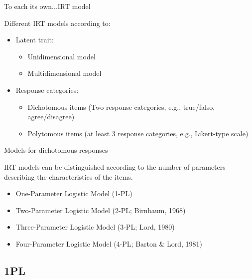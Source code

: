 \documentclass[aspectratio=149, compress]{beamer}
\begin{document}
\begin{frame}{To each its own...IRT model}

Different IRT models according to:
	
\begin{itemize}
	\item Latent trait:
	\begin{itemize}
		\item \textcolor<2>{unipd}{Unidimensional model}
		\item  Multidimensional model	
	\end{itemize}
	
	\item Response categories: 
	
	\begin{itemize}
		\item  \textcolor<2>{unipd}{Dichotomous items} (Two response categories, e.g., true/falso, agree/disagree)
		\item Polytomous items (at least 3 response categories, e.g., Likert-type scale)
	\end{itemize}
\end{itemize} 

\end{frame}

\begin{frame}{Models for dichotomous responses}

IRT models can be distinguished according to the number of parameters describing the characteristics of the items. 
	
	\begin{itemize}
	\item One-Parameter Logistic Model (1-PL)
		
	\item Two-Parameter Logistic Model (2-PL; Birnbaum, 1968)
		
     \item Three-Parameter Logistic Model (3-PL; Lord, 1980)
		
	\item Four-Parameter Logistic Model (4-PL; Barton \& Lord, 1981)
	\end{itemize}
	

	
\end{frame}

\subsection*{1PL}
\end{document}
